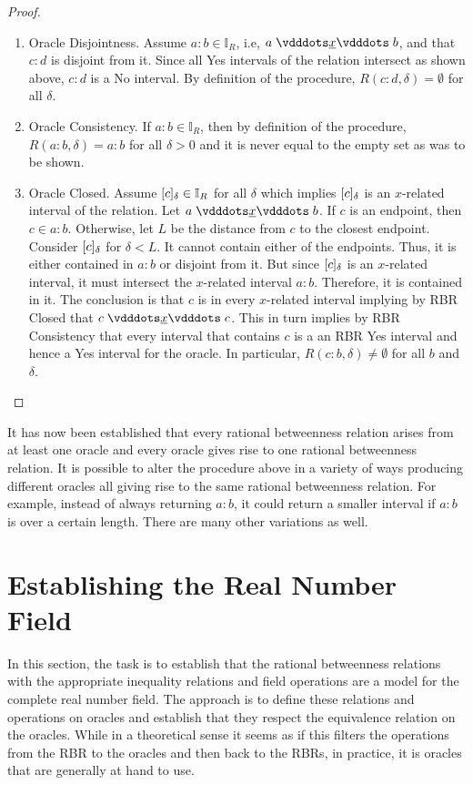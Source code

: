 \documentclass[12pt]{article}
\begin{document}
\begin{proof}
\begin{enumerate}
        \item Oracle Disjointness. Assume $a:b \in \mathbb{I}_R$, i.e, $a \xrel b$, and that $c:d$ is disjoint from it. Since all Yes intervals of the relation intersect as shown above, $c:d$ is a No interval. By definition of the procedure, $R(c:d, \delta) = \emptyset$ for all $\delta$. 
        \item Oracle Consistency. If $a:b \in \mathbb{I}_R$, then by definition of the procedure, $R(a:b, \delta) = a:b$ for all $\delta >0$ and it is never equal to the empty set as was to be shown. 
        \item Oracle Closed. Assume $[c]_{\delta} \in \mathbb{I}_R$ for all $\delta$ which implies $[c]_{\delta}$ is an $x$-related interval of the relation. Let $a \xrel b$. If $c$ is an endpoint, then $c \in a:b$. Otherwise, let $L$ be the distance from $c$ to the closest endpoint. Consider $[c]_{\delta}$ for $\delta < L$. It cannot contain either of the endpoints. Thus, it is either contained in $a:b$ or disjoint from it. But since $[c]_{\delta}$ is an $x$-related interval, it must intersect the $x$-related interval $a:b$. Therefore, it is contained in it. The conclusion is that $c$ is in every $x$-related interval implying by RBR Closed that $c \xrel c$. This in turn implies by RBR Consistency that every interval that contains $c$ is a an RBR Yes interval and hence a Yes interval for the oracle. In particular, $R(c:b, \delta) \neq \emptyset$ for all $b$ and $\delta$. 
    \end{enumerate}
\end{proof}


It has now been established that every rational betweenness relation arises from at least one oracle and every oracle gives rise to one rational betweenness relation. It is possible to alter the procedure above in a variety of ways producing different oracles all giving rise to the same rational betweenness relation. For example, instead of always returning $a:b$, it could return a smaller interval if $a:b$ is over a certain length. There are many other variations as well. 




\section{Establishing the Real Number Field}

In this section, the task is to establish that the rational betweenness relations with the appropriate inequality relations and field operations are a model for the complete real number field. The approach is to define these relations and operations on oracles and establish that they respect the equivalence relation on the oracles. While in a theoretical sense it seems as if this filters the operations from the RBR to the oracles and then back to the RBRs, in practice, it is oracles that are generally at hand to use. 
\end{document}
